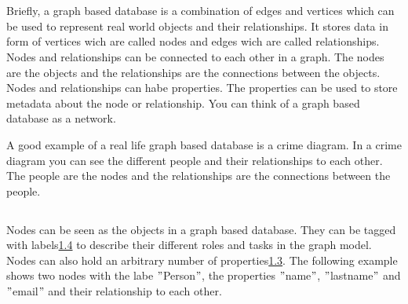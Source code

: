 \usepackage{lipsum}
\usepackage{listings}
\usepackage{hyperref}%

\section{}
Briefly, a graph based database is a combination of edges and vertices which  can be used to represent real world
objects and their relationships.
It stores data in form of vertices wich are called nodes and edges wich are called relationships.
Nodes and relationships can be connected to each other in a graph.
The nodes are the objects and the relationships are the connections between the objects.
Nodes and relationships can habe properties.
The properties can be used to store metadata about the node or relationship.\cite[P. 6f. ]{PractivalNeo4j}
You can think of a graph based database as a network.

A good example of a real life graph based database is a crime diagram.
In a crime diagram you can see the different people and their relationships to each other.
The people are the nodes and the relationships are the connections between the people. \cite[P. 6f. ]{BeginningNeo4j}

\subsection{}
Nodes can be seen as the objects in a graph based database.
They can be tagged with labels\ref{subsec:labels} to describe their different roles and tasks in the graph model.
Nodes can also hold an arbitrary number of properties\ref{subsec:tbd{properties}}.
The following example shows two nodes with the labe \("\)Person\("\), the properties \("\)name\("\), \("\)lastname\("\)
and \("\)email\("\) and their relationship to each other.
\subsection{}\label{subsec:tbd{relationships}}
\subsection{} \label{subsec:tbd{properties}}
\subsection{} \label{subsec:labels}
\subsection{}\label{subsec:tbd{traversal-and-indexing}}
